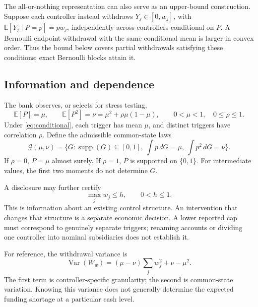 \documentclass[11pt]{article}
\theoremstyle{definition}\newtheorem{definition}[theorem]{Definition}
\newcommand{\E}{\mathbb E}
\newcommand{\G}{\mathcal G}
\begin{document}
The all-or-nothing representation can also serve as an upper-bound construction. Suppose each controller instead withdraws \(Y_j\in[0,w_j]\), with \(\E[Y_j\mid P=p]=pw_j\), independently across controllers conditional on \(P\). A Bernoulli endpoint withdrawal with the same conditional mean is larger in convex order. Thus the bound below covers partial withdrawals satisfying these conditions; exact Bernoulli blocks attain it.

\subsection{Information and dependence}
The bank observes, or selects for stress testing,
\begin{equation}
 \E[P]=\mu,\qquad \E[P^2]=\nu
 =\mu^2+\rho\mu(1-\mu),\qquad 0<\mu<1,\quad0\leq\rho\leq1.
 \label{eq:moments}
\end{equation}
Under \eqref{eq:conditional}, each trigger has mean \(\mu\), and distinct triggers have correlation \(\rho\). Define the admissible common-state laws
\begin{equation}
 \G(\mu,\nu)=\{G:\operatorname{supp}(G)\subseteq[0,1],\
                   \textstyle\int p\,dG=\mu,\ \int p^2\,dG=\nu\}.
 \label{eq:G}
\end{equation}
If \(\rho=0\), \(P=\mu\) almost surely. If \(\rho=1\), \(P\) is supported on \(\{0,1\}\). For intermediate values, the first two moments do not determine \(G\).

A disclosure may further certify
\begin{equation}
 \max_jw_j\leq h,\qquad 0<h\leq1.
 \label{eq:cap}
\end{equation}
This is information about an existing control structure. An intervention that changes that structure is a separate economic decision. A lower reported cap must correspond to genuinely separate triggers; renaming accounts or dividing one controller into nominal subsidiaries does not establish it.

For reference, the withdrawal variance is
\begin{equation}
 \operatorname{Var}(W_w)=(\mu-\nu)\sum_jw_j^2+\nu-\mu^2.
 \label{eq:variance}
\end{equation}
The first term is controller-specific granularity; the second is common-state variation. Knowing this variance does not generally determine the expected funding shortage at a particular cash level.
\end{document}
